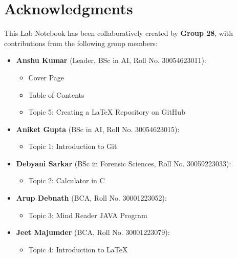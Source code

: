 \section*{Acknowledgments}

This Lab Notebook has been collaboratively created by \textbf{Group 28}, with contributions from the following group members:

\begin{itemize}
    \item \textbf{Anshu Kumar} (Leader, BSc in AI, Roll No. 30054623011):
    \begin{itemize}
        \item Cover Page
        \item Table of Contents
        \item Topic 5: Creating a LaTeX Repository on GitHub
    \end{itemize}
    
    \item \textbf{Aniket Gupta} (BSc in AI, Roll No. 30054623015):
    \begin{itemize}
        \item Topic 1: Introduction to Git
    \end{itemize}
    
    \item \textbf{Debyani Sarkar} (BSc in Forensic Sciences, Roll No. 30059223033):
    \begin{itemize}
        \item Topic 2: Calculator in C
    \end{itemize}
    
    \item \textbf{Arup Debnath} (BCA, Roll No. 30001223052):
    \begin{itemize}
        \item Topic 3: Mind Reader JAVA Program
    \end{itemize}
    
    \item \textbf{Jeet Majumder} (BCA, Roll No. 30001223079):
    \begin{itemize}
        \item Topic 4: Introduction to LaTeX
    \end{itemize}
    
\end{itemize}

